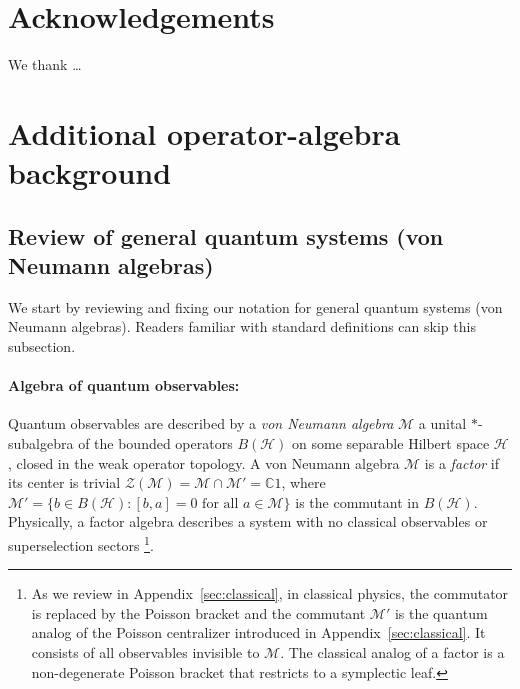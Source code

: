 \documentclass[a4paper,11pt]{article}
\theoremstyle{definition}
\newcommand{\mH}{\mathcal{H}}
\newcommand{\mM}{\mathcal{M}}
\begin{document}
\section*{Acknowledgements}
We thank \ldots

\appendix



\section{Additional operator-algebra background}\label{app:extra-operator-algebra}

\subsection{Review of general quantum systems (von Neumann algebras)}\label{app:vN}


We start by reviewing and fixing our notation for general quantum systems (von Neumann algebras). Readers familiar with standard definitions can skip this subsection.

\paragraph{Algebra of quantum observables:}
Quantum observables are described by a
\emph{von Neumann algebra} $\mM$ a unital $*$-subalgebra of the bounded operators
$B(\mathcal{H})$ on some separable Hilbert space $\mathcal{H}$, closed in the
weak operator topology.
A von Neumann algebra $\mM$ is a \emph{factor} if its center is trivial
$\mathcal{Z}(\mM) = \mM\cap\mM'=\mathbb{C} 1$, where $\mM' = \{b\in B(\mathcal{H}) : [b,a]=0\text{ for all }a\in\mM\}$
is the commutant in $B(\mH)$.  Physically, a factor algebra describes a system with no classical observables
 or superselection sectors \footnote{As we review in Appendix~\ref{sec:classical}, in classical physics, the commutator is replaced by the Poisson bracket and the commutant $\mM'$ is the quantum analog of the Poisson
centralizer introduced in Appendix~\ref{sec:classical}. It consists of all observables invisible to $\mM$. The classical analog of a factor is a non-degenerate Poisson bracket that restricts to a symplectic leaf.}.
\end{document}
